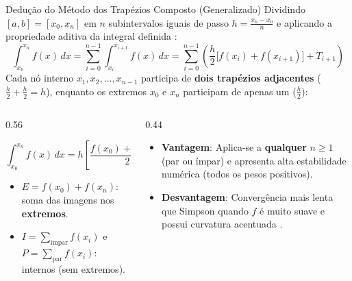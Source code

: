 \documentclass[aspectratio=169]{beamer}
\newcommand{\highlight}[1]{\textcolor{primary}{\textbf{#1}}}
\newcommand{\emphred}[1]{\textcolor{secondary}{\textbf{#1}}}
\newcommand{\emphgreen}[1]{\textcolor{accent}{\textbf{#1}}}
\begin{document}
\begin{frame}{Dedução do Método dos Trapézios Composto (Generalizado)}
\footnotesize
Dividindo $[a, b] = [x_0, x_n]$ em $n$ subintervalos iguais de passo $h = \frac{x_n - x_0}{n}$ e aplicando a propriedade aditiva da integral definida \cite{santos2010, claudio1994, mesquita2026}:
\[
\int_{x_0}^{x_n} f(x)\,dx = \sum_{i=0}^{n-1} \int_{x_i}^{x_{i+1}} f(x)\,dx = \sum_{i=0}^{n-1} \left( \frac{h}{2}\big[f(x_i) + f(x_{i+1})\big] + T_{i+1} \right)
\]
Cada nó interno $x_1, x_2, \dots, x_{n-1}$ participa de \highlight{dois trapézios adjacentes} ($\frac{h}{2} + \frac{h}{2} = h$), enquanto os extremos $x_0$ e $x_n$ participam de apenas um ($\frac{h}{2}$):

\begin{columns}[T]
\begin{column}{0.56\textwidth}
\begin{bee}
\[
\int_{x_0}^{x_n} f(x)\,dx = h \left[ \frac{f(x_0) + f(x_n)}{2} + \sum_{i=1}^{n-1} f(x_i) \right] + T_t \approx h\left(\frac{E}{2} + I + P\right)
\]
\begin{itemize}\tiny
    \item $E = f(x_0) + f(x_n)$: soma das imagens nos \textbf{extremos}.
    \item $I = \sum_{\text{ímpar}} f(x_i)$ e $P = \sum_{\text{par}} f(x_i)$: internos (sem extremos).
\end{itemize}
\end{bee}
\end{column}

\begin{column}{0.44\textwidth}
\begin{bee}
\begin{itemize}\scriptsize
    \item \emphgreen{Vantagem}: Aplica-se a \textbf{qualquer} $n \ge 1$ (par ou ímpar) e apresenta alta estabilidade numérica (todos os pesos positivos).
    \item \emphred{Desvantagem}: Convergência mais lenta que Simpson quando $f$ é muito suave e possui curvatura acentuada \cite{ruggiero1996}.
\end{itemize}
\end{bee}
\end{column}
\end{columns}
\end{frame}
\end{document}
